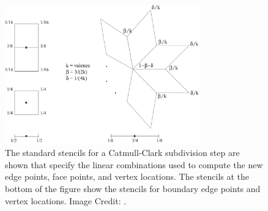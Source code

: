 \documentclass[12pt, letterpaper]{article}
\begin{document}
		\begin{figure}[h]
		\centering
		\includegraphics[width=0.75\textwidth]{Catmull_Clark_stencils}
		\caption{The standard stencils for a Catmull-Clark subdivision step are shown that specify the linear combinations used to 
				compute the new edge points, face points, and vertex locations. The stencils at the bottom of the figure show the stencils 
				for boundary edge points and vertex locations. Image Credit: \cite{BS}.}

		\label{fig:Catmull-Clark-stencils}
		\end{figure}
\end{document}
